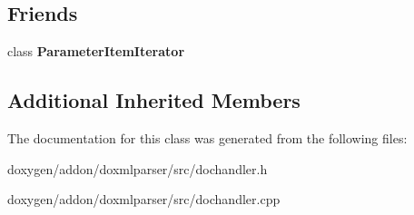 \subsection*{Friends}
\begin{DoxyCompactItemize}
\item 
\mbox{\label{class_parameter_item_handler_a5084664195c4e350e777e905f6f66caa}} 
class {\bfseries Parameter\+Item\+Iterator}
\end{DoxyCompactItemize}
\subsection*{Additional Inherited Members}


The documentation for this class was generated from the following files\+:\begin{DoxyCompactItemize}
\item 
doxygen/addon/doxmlparser/src/dochandler.\+h\item 
doxygen/addon/doxmlparser/src/dochandler.\+cpp\end{DoxyCompactItemize}
